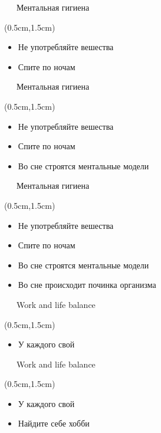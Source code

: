 \documentclass[xetex,18pt,aspectratio=43]{beamer}
\begin{document}
\begin{Large}
\begin{frame}{\ \ \ Ментальная гигиена}
\begin{textblock*}{\framewidth-0.8cm}(0.5cm,1.5cm)
\begin{itemize}
  \item Не употребляйте вешества
  \item Спите по ночам
\end{itemize}
\end{textblock*}
\end{frame}

\begin{frame}{\ \ \ Ментальная гигиена}
\begin{textblock*}{\framewidth-0.8cm}(0.5cm,1.5cm)
\begin{itemize}
  \item Не употребляйте вешества
  \item Спите по ночам
  \item Во сне строятся ментальные модели
\end{itemize}
\end{textblock*}
\end{frame}

\begin{frame}{\ \ \ Ментальная гигиена}
\begin{textblock*}{\framewidth-0.8cm}(0.5cm,1.5cm)
\begin{itemize}
  \item Не употребляйте вешества
  \item Спите по ночам
  \item Во сне строятся ментальные модели
  \item Во сне происходит починка организма
\end{itemize}
\end{textblock*}
\end{frame}

\begin{frame}{\ \ \ Work and life balance}
\begin{textblock*}{\framewidth-0.8cm}(0.5cm,1.5cm)
\begin{itemize}
  \item У каждого свой
\end{itemize}
\end{textblock*}
\end{frame}

\begin{frame}{\ \ \ Work and life balance}
\begin{textblock*}{\framewidth-0.8cm}(0.5cm,1.5cm)
\begin{itemize}
  \item У каждого свой
  \item Найдите себе хобби
\end{itemize}
\end{textblock*}
\end{frame}


\end{Large}
\end{document}
